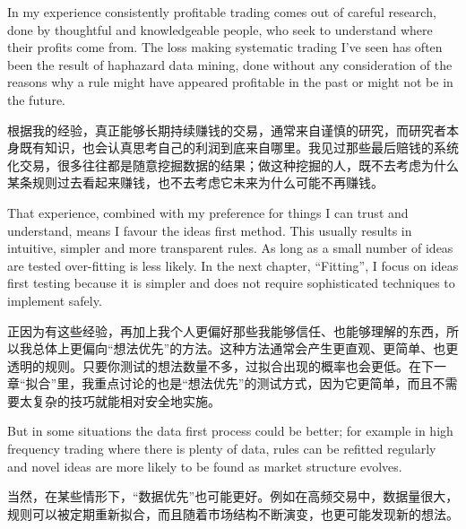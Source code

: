 \begin{englishblock} In my experience consistently profitable trading comes out of careful research, done by thoughtful and knowledgeable people, who seek to understand where their profits come from. The loss making systematic trading I've seen has often been the result of haphazard data mining, done without any consideration of the reasons why a rule might have appeared profitable in the past or might not be in the future. \end{englishblock}

\begin{chineseblock}根据我的经验，真正能够长期持续赚钱的交易，通常来自谨慎的研究，而研究者本身既有知识，也会认真思考自己的利润到底来自哪里。我见过那些最后赔钱的系统化交易，很多往往都是随意挖掘数据的结果；做这种挖掘的人，既不去考虑为什么某条规则过去看起来赚钱，也不去考虑它未来为什么可能不再赚钱。\end{chineseblock}

\bipairgap

\begin{englishblock} That experience, combined with my preference for things I can trust and understand, means I favour the ideas first method. This usually results in intuitive, simpler and more transparent rules. As long as a small number of ideas are tested over-fitting is less likely. In the next chapter, ``Fitting'', I focus on ideas first testing because it is simpler and does not require sophisticated techniques to implement safely. \end{englishblock}

\begin{chineseblock}正因为有这些经验，再加上我个人更偏好那些我能够信任、也能够理解的东西，所以我总体上更偏向“想法优先”的方法。这种方法通常会产生更直观、更简单、也更透明的规则。只要你测试的想法数量不多，过拟合出现的概率也会更低。在下一章“拟合”里，我重点讨论的也是“想法优先”的测试方式，因为它更简单，而且不需要太复杂的技巧就能相对安全地实施。\end{chineseblock}

\bipairgap

\begin{englishblock} But in some situations the data first process could be better; for example in high frequency trading where there is plenty of data, rules can be refitted regularly and novel ideas are more likely to be found as market structure evolves. \end{englishblock}

\begin{chineseblock}当然，在某些情形下，“数据优先”也可能更好。例如在高频交易中，数据量很大，规则可以被定期重新拟合，而且随着市场结构不断演变，也更可能发现新的想法。\end{chineseblock}

